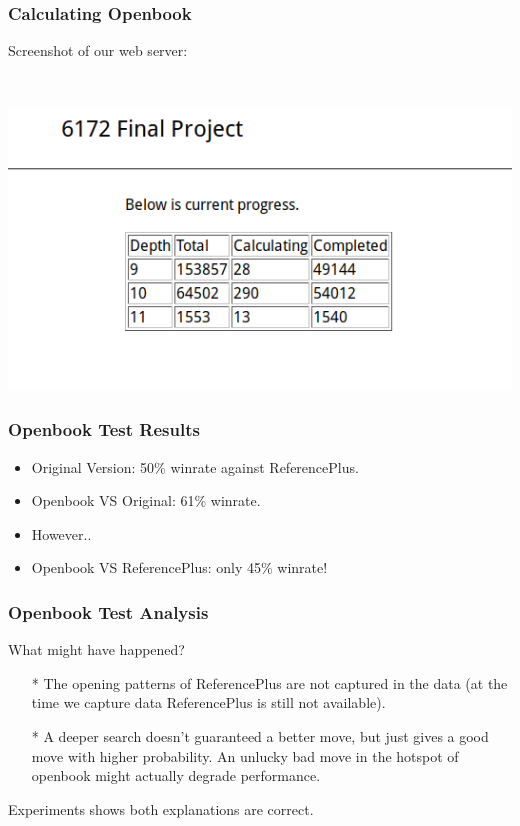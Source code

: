 \documentclass[10pt]{beamer}
\begin{document}
	\begin{frame}
		\frametitle{Calculating Openbook}

		Screenshot of our web server:

		\

		\includegraphics[scale=0.5]{screenshot1.png}
	\end{frame}

	\begin{frame}
		\frametitle{Openbook Test Results}

		\begin{itemize}
		\item Original Version: \textcolor{fgreen}{50\%} winrate against ReferencePlus.
		\item Openbook VS Original: \textcolor{fgreen}{61\%} winrate.\pause
		\item However..
		\item Openbook VS ReferencePlus: only \textcolor{dred}{45\%} winrate!
		\end{itemize}
	\end{frame}

	\begin{frame}
		\frametitle{Openbook Test Analysis}

		What might have happened?

		\begin{itemize}
		\item[*] The opening patterns of ReferencePlus are not captured in the data
		(at the time we capture data ReferencePlus is still not available).
		\item[*] A deeper search doesn't guaranteed a better move, but just gives a good move with higher probability.
		An unlucky bad move in the hotspot of openbook might actually degrade performance.
		\end{itemize}

		Experiments shows \textcolor{fgreen}{both} explanations are correct.
	\end{frame}
\end{document}
